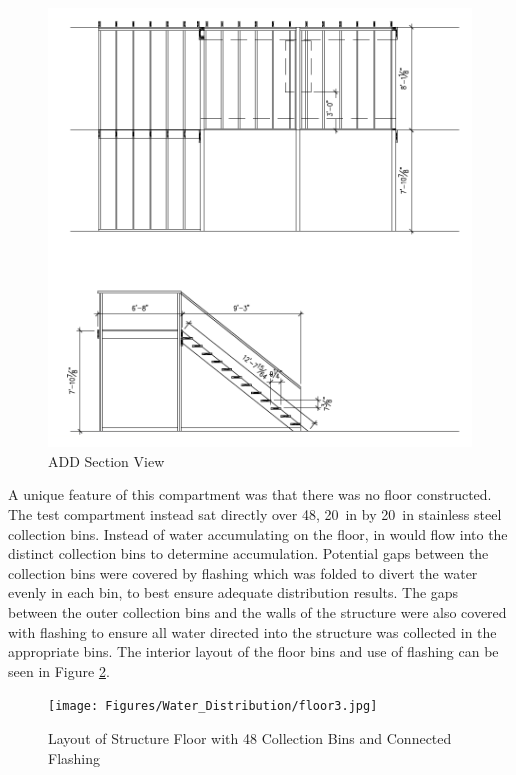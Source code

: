 \documentclass{article}
\begin{document}
\begin{figure}[!ht]
	\centering
	\includegraphics[width=\columnwidth]{Figures/Water_Distribution/ADDsideviewprint}
	\caption{ADD Section View}
	\label{fig:ADD_Side_View}
\end{figure}

\clearpage

A unique feature of this compartment was that there was no floor constructed. The test compartment instead sat directly over 48, 20~in by 20~in stainless steel collection bins. Instead of water accumulating on the floor, in would flow into the distinct collection bins to determine accumulation. Potential gaps between the collection bins were covered by flashing which was folded to divert the water evenly in each bin, to best ensure adequate distribution results. The gaps between the outer collection bins and the walls of the structure were also covered with flashing to ensure all water directed into the structure was collected in the appropriate bins. The interior layout of the floor bins and use of flashing can be seen in Figure \ref{fig:ADD_Flashing}. 

\begin{figure}[!ht]
	\centering
	\texttt{[image: Figures/Water\_Distribution/floor3.jpg]}
	\caption{Layout of Structure Floor with 48 Collection Bins and Connected Flashing}
	\label{fig:ADD_Flashing}
\end{figure}
\end{document}

